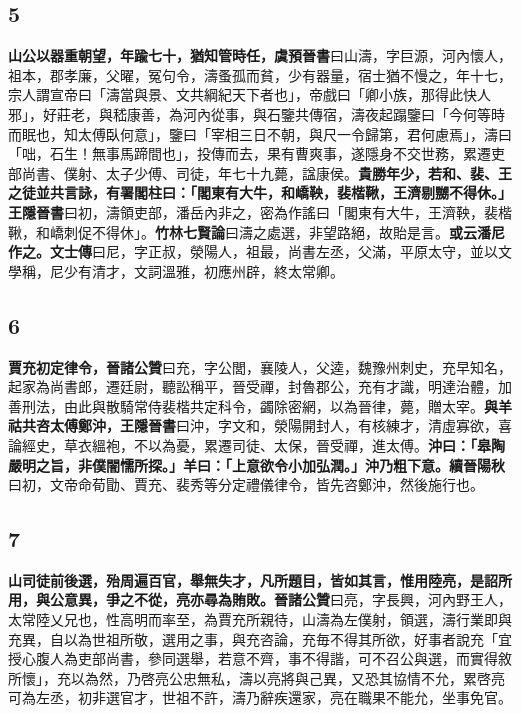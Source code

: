 \subsection*{5}

\textbf{山公以器重朝望，年踰七十，猶知管時任，}{\footnotesize \textbf{虞預晉書}曰山濤，字巨源，河內懷人，祖本，郡孝廉，父曜，冤句令，濤蚤孤而貧，少有器量，宿士猶不慢之，年十七，宗人謂宣帝曰「濤當與景、文共綱紀天下者也」，帝戲曰「卿小族，那得此快人邪」，好莊老，與嵇康善，為河內從事，與石鑒共傳宿，濤夜起蹋鑒曰「今何等時而眠也，知太傅臥何意」，鑒曰「宰相三日不朝，與尺一令歸第，君何慮焉」，濤曰「咄，石生！無事馬蹄間也」，投傳而去，果有曹爽事，遂隱身不交世務，累遷吏部尚書、僕射、太子少傅、司徒，年七十九薨，諡康侯。}\textbf{貴勝年少，若和、裴、王之徒並共言詠，有署閣柱曰：「閣東有大牛，和嶠鞅，裴楷鞦，王濟剔嬲不得休。」}{\footnotesize \textbf{王隱晉書}曰初，濤領吏部，潘岳內非之，密為作謠曰「閣東有大牛，王濟鞅，裴楷鞦，和嶠刺促不得休」。\textbf{竹林七賢論}曰濤之處選，非望路絕，故貽是言。}\textbf{或云潘尼作之。}{\footnotesize \textbf{文士傳}曰尼，字正叔，滎陽人，祖最，尚書左丞，父滿，平原太守，並以文學稱，尼少有清才，文詞溫雅，初應州辟，終太常卿。}

\subsection*{6}

\textbf{賈充初定律令，}{\footnotesize \textbf{晉諸公贊}曰充，字公閭，襄陵人，父逵，魏豫州刺史，充早知名，起家為尚書郎，遷廷尉，聽訟稱平，晉受禪，封魯郡公，充有才識，明達治體，加善刑法，由此與散騎常侍裴楷共定科令，蠲除密網，以為晉律，薨，贈太宰。}\textbf{與羊祜共咨太傅鄭沖，}{\footnotesize \textbf{王隱晉書}曰沖，字文和，滎陽開封人，有核練才，清虛寡欲，喜論經史，草衣縕袍，不以為憂，累遷司徒、太保，晉受禪，進太傅。}\textbf{沖曰：「皋陶嚴明之旨，非僕闇懦所探。」羊曰：「上意欲令小加弘潤。」沖乃粗下意。}{\footnotesize \textbf{續晉陽秋}曰初，文帝命荀勖、賈充、裴秀等分定禮儀律令，皆先咨鄭沖，然後施行也。}

\subsection*{7}

\textbf{山司徒前後選，殆周遍百官，舉無失才，凡所題目，皆如其言，惟用陸亮，是詔所用，與公意異，爭之不從，亮亦尋為賄敗。}{\footnotesize \textbf{晉諸公贊}曰亮，字長興，河內野王人，太常陸乂兄也，性高明而率至，為賈充所親待，山濤為左僕射，領選，濤行業即與充異，自以為世祖所敬，選用之事，與充咨論，充毎不得其所欲，好事者說充「宜授心腹人為吏部尚書，參同選舉，若意不齊，事不得諧，可不召公與選，而實得敘所懷」，充以為然，乃啓亮公忠無私，濤以亮將與己異，又恐其協情不允，累啓亮可為左丞，初非選官才，世祖不許，濤乃辭疾還家，亮在職果不能允，坐事免官。}

